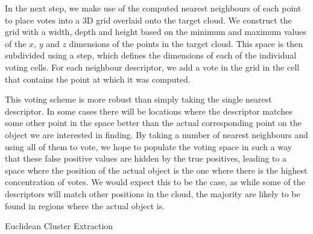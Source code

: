 \documentclass[11pt,a4paper]{kth-mag}
\begin{document}
In the next step, we make use of the computed nearest neighbours of each point
to place votes into a 3D grid overlaid onto the target cloud. We construct the
grid with a width, depth and height based on the minimum and maximum values of
the $x$, $y$ and $z$ dimensions of the points in the target cloud. This space is
then subdivided using a step, which defines the dimensions of each of the
individual voting cells. For each neighbour descriptor, we add a vote in the
grid in the cell that contains the point at which it was computed.

This voting scheme is more robust than simply taking the single nearest
descriptor. In some cases there will be locations where the descriptor matches
some other point in the space better than the actual corresponding point on the
object we are interested in finding. By taking a number of nearest neighbours
and using all of them to vote, we hope to populate the voting space in such a
way that these false positive values are hidden by the true positives, leading
to a space where the position of the actual object is the one where there is the
highest concentration of votes. We would expect this to be the case, as while
some of the descriptors will match other positions in the cloud, the majority
are likely to be found in regions where the actual object is.


\begin{algorithm}
  \DontPrintSemicolon
  \caption{Euclidean Cluster Extraction \cite{RusuDoctoralDissertation}}
  \label{alg:euc}
\end{algorithm}
\end{document}
